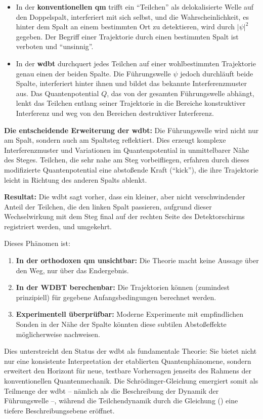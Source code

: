 \begin{itemize}
    \item In der \textbf{konventionellen \gls{qm}} trifft ein \enquote{Teilchen} als delokalisierte Welle auf den Doppelspalt, interferiert mit sich selbst, und die Wahrscheinlichkeit, es hinter dem Spalt an einem bestimmten Ort zu detektieren, wird durch $\left| \psi \right|^2$ gegeben. Der Begriff einer Trajektorie durch einen bestimmten Spalt ist verboten und \enquote{unsinnig}.
    \item In der \textbf{\gls{wdbt}} durchquert jedes Teilchen auf einer wohlbestimmten Trajektorie genau einen der beiden Spalte. Die Führungswelle $\psi$ jedoch durchläuft beide Spalte, interferiert hinter ihnen und bildet das bekannte Interferenzmuster aus. Das Quantenpotential $Q$, das von der gesamten Führungswelle abhängt, lenkt das Teilchen entlang seiner Trajektorie in die Bereiche konstruktiver Interferenz und weg von den Bereichen destruktiver Interferenz.
\end{itemize}

\textbf{Die entscheidende Erweiterung der \gls{wdbt}:} Die Führungswelle wird nicht nur am Spalt, sondern auch am Spaltsteg reflektiert. Dies erzeugt komplexe Interferenzmuster und Variationen im
Quantenpotential in unmittelbarer Nähe des Steges. Teilchen, die sehr nahe am Steg vorbeifliegen, erfahren durch dieses modifizierte Quantenpotential eine abstoßende Kraft (\enquote{kick}), die ihre
Trajektorie leicht in Richtung des anderen Spalts ablenkt.

\textbf{Resultat:} Die \gls{wdbt} sagt vorher, dass ein kleiner, aber nicht verschwindender Anteil der Teilchen, die den linken Spalt passieren, aufgrund dieser Wechselwirkung mit dem Steg final auf
der rechten Seite des Detektorschirms registriert werden, und umgekehrt.

Dieses Phänomen ist:

\begin{enumerate}
    \item \textbf{In der orthodoxen \gls{qm} unsichtbar:} Die Theorie macht keine Aussage über den Weg, nur über das Endergebnis.
    \item \textbf{In der WDBT berechenbar:} Die Trajektorien können (zumindest prinzipiell) für gegebene Anfangsbedingungen berechnet werden.
    \item \textbf{Experimentell überprüfbar:} Moderne Experimente mit empfindlichen Sonden in der Nähe der Spalte könnten diese subtilen Abstoßeffekte möglicherweise nachweisen.
\end{enumerate}

Dies unterstreicht den Status der \gls{wdbt} als fundamentale Theorie: Sie bietet nicht nur eine konsistente Interpretation der etablierten Quantenphänomene, sondern erweitert den Horizont für neue,
testbare Vorhersagen jenseits des Rahmens der konventionellen Quantenmechanik. Die Schrödinger-Gleichung emergiert somit als Teilmenge der \gls{wdbt} – nämlich als die Beschreibung der Dynamik der
Führungswelle –, während die Teilchendynamik durch die Gleichung () eine tiefere Beschreibungsebene eröffnet.


